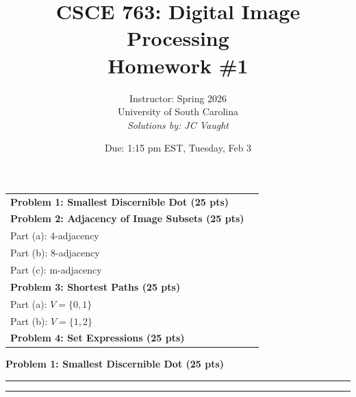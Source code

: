 \documentclass[12pt]{article}
\title{CSCE 763: Digital Image Processing \\ Homework \#1}
\author{Instructor: Spring 2026 \\ University of South Carolina \\ \textit{Solutions by: JC Vaught}}
\date{Due: 1:15 pm EST, Tuesday, Feb 3}
\newcommand{\question}[1]{%
  \clearpage
  \vspace{0.5cm}
  {\noindent\normalsize \textbf{#1}}
  \vspace{0.2cm}
  \hrule
  \vspace{0.1cm}
  \hrule
  \vspace{0.3cm}
}
\begin{document}
\maketitle
\setlength{\parindent}{0pt}



\begin{center}
\begin{tcolorbox}[colback=white, colframe=gray!50!black, colbacktitle=gray!20!white,
                  coltitle=black, sharp corners, boxrule=1pt,
                  title=\Large\bfseries Table of Contents]
\begin{tabular}{p{}r}
\textbf{Problem 1: Smallest Discernible Dot (25 pts)} \dotfill & \textbf{\pageref{quest:1}} \\[0.3em]
\textbf{Problem 2: Adjacency of Image Subsets (25 pts)} & \\
\quad Part (a): 4-adjacency \dotfill & \textbf{\pageref{quest:2}} \\
\quad Part (b): 8-adjacency \dotfill & \textbf{\pageref{quest:2}} \\
\quad Part (c): m-adjacency \dotfill & \textbf{\pageref{quest:2}} \\[0.3em]
\textbf{Problem 3: Shortest Paths (25 pts)} & \\
\quad Part (a): $V = \{0, 1\}$ \dotfill & \textbf{\pageref{quest:3}} \\
\quad Part (b): $V = \{1, 2\}$ \dotfill & \textbf{\pageref{quest:3}} \\[0.3em]
\textbf{Problem 4: Set Expressions (25 pts)} \dotfill & \textbf{\pageref{quest:4}} \\
\end{tabular}
\vspace{0.2cm}
\end{tcolorbox}
\end{center}

\vspace{0.5cm}


\question{Problem 1: Smallest Discernible Dot (25 pts)}\label{quest:1}
\end{document}
